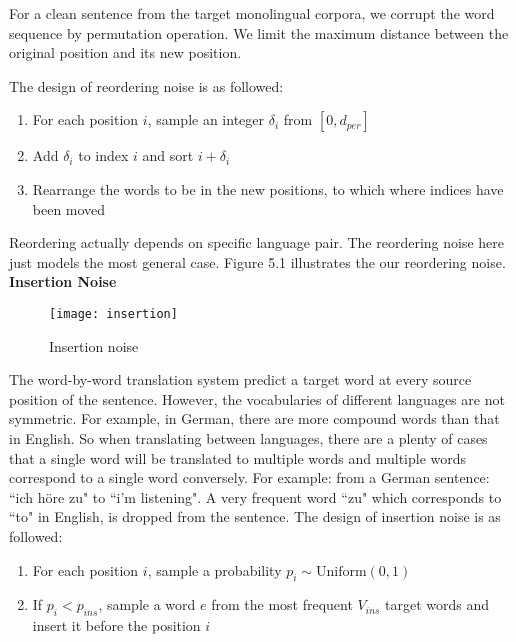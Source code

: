 	For a clean sentence from the target monolingual corpora, we corrupt the word sequence by permutation operation. We limit the maximum distance between the original position and its new position.
	
	The design of reordering noise is as followed:
	\begin{enumerate}
		\item For each position ${i}$, sample an integer ${\delta_i}$ from ${[0, d_{per}]}$
		\item Add ${\delta_{i}}$ to index ${i}$ and sort ${i+\delta_{i}}$
		\item Rearrange the words to be in the new positions, to which where indices have been moved
	\end{enumerate}
	
	Reordering actually depends on specific language pair. The reordering noise here just models the most general case. Figure 5.1 illustrates the our reordering noise.\\

	
	\textbf{Insertion Noise}\\
	\begin{figure}[ht]
	\texttt{[image: insertion]}
	\caption{Insertion noise}

\end{figure}	

	The word-by-word translation system predict a target word at every source position of the sentence. However,  the vocabularies of different languages are not symmetric. For example, in German, there are more compound words than that in English. So when translating between languages, there are a plenty of cases that a single word will be translated to multiple words and multiple words correspond to a single word conversely. For example: from a German sentence: ``ich höre zu" to ``i'm listening". A very frequent word ``zu" which corresponds to ``to" in English, is dropped from the sentence. The design of insertion noise is as followed:
	\begin{enumerate}	
		\item For each position ${i}$, sample a probability ${p_i \sim \textrm{Uniform}(0,1)}$
		\item If ${p_i} < p_{ins}$, sample a word ${e}$ from the most frequent ${V_{ins}}$ target words and insert it before the position ${i}$
	\end{enumerate}

